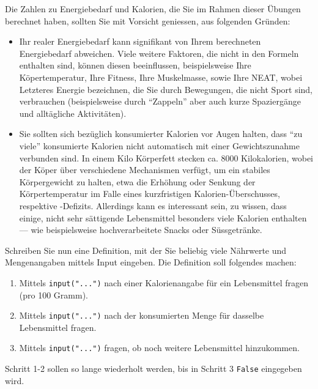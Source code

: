 \begin{mycaution}
Die Zahlen zu Energiebedarf und Kalorien, die Sie im Rahmen dieser Übungen berechnet haben, sollten Sie mit Vorsicht geniessen, aus folgenden Gründen:
\begin{itemize}
\item Ihr realer Energiebedarf kann signifikant von Ihrem berechneten Energiebedarf abweichen. Viele weitere Faktoren, die nicht in den Formeln enthalten sind, können diesen beeinflussen, beispielsweise Ihre Köpertemperatur, Ihre Fitness, Ihre Muskelmasse, sowie Ihre \gls{NEAT}, wobei Letzteres Energie bezeichnen, die Sie durch Bewegungen, die nicht Sport sind, verbrauchen (beispielsweise durch ``Zappeln'' aber auch kurze Spaziergänge und alltägliche Aktivitäten).
\item Sie sollten sich bezüglich konsumierter Kalorien vor Augen halten, dass ``zu viele'' konsumierte Kalorien nicht automatisch mit einer Gewichtszunahme verbunden sind. In einem Kilo Körperfett stecken ca. 8000 Kilokalorien, wobei der Köper über verschiedene Mechanismen verfügt, um ein stabiles Körpergewicht zu halten, etwa die Erhöhung oder Senkung der Körpertemperatur im Falle eines kurzfristigen Kalorien-Überschusses, respektive -Defizits. Allerdings kann es interessant sein, zu wissen, dass einige, nicht sehr sättigende Lebensmittel besonders viele Kalorien enthalten –– wie beispielsweise hochverarbeitete Snacks oder Süssgetränke.
\end{itemize}
\end{mycaution}

\begin{mychallenge}
Schreiben Sie nun eine Definition, mit der Sie beliebig viele Nährwerte und Mengenangaben mittels Input eingeben. Die Definition soll folgendes machen:
\begin{enumerate}
\item Mittels \lstinline|input("...")| nach einer Kalorienangabe für ein Lebensmittel fragen (pro 100 Gramm).
\item Mittels \lstinline|input("...")| nach der konsumierten Menge für dasselbe Lebensmittel fragen.
\item Mittels \lstinline|input("...")| fragen, ob noch weitere Lebensmittel hinzukommen.
\end{enumerate}

Schritt 1-2 sollen so lange wiederholt werden, bis in Schritt 3  \lstinline|False| eingegeben wird.
\begin{myanswer}

\end{myanswer}

\end{mychallenge}

